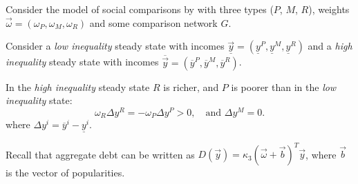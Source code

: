 
 Consider the model of social comparisons by \citet{drechsel2025falling-behind}
with three types ($P$, $M$, $R$), weights $\vec \omega = (\omega_P, \omega_M, \omega_R)$ 
and 
some comparison network $G$.

    Consider a \emph{low inequality} steady state 
    with incomes $\underline{\vec y} = (\underline y^P, \underline y^M, \underline y^R)$
    and a \emph{high inequality} steady state 
    with incomes $\overline{\vec y} = (\overline y^P, \overline y^M, \overline y^R)$.
    
    In the \emph{high inequality} steady state $R$ is richer, and $P$ is poorer than in the \emph{low inequality} state:%
    \begin{equation*}
        \omega_R \Delta y^R = - \omega_P \Delta y^P > 0, \quad \text{and } \Delta y^M = 0.
    \end{equation*}
    where $\Delta y^i = \overline y^i - \underline y^i$.
    
    Recall that aggregate debt can be written as $D(\vec y) = \kappa_3 (\vec \omega + \vec b)^T \vec y$, where $\vec b$ is the vector of popularities.

